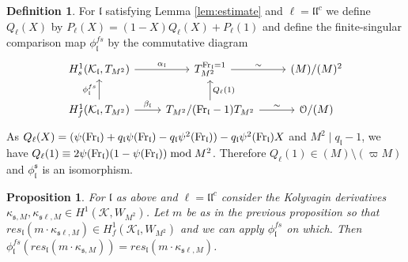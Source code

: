\documentclass[leqno]{amsart}
\newtheorem{prop}[thm]{Proposition}
\theoremstyle{definition}
\newtheorem{defn}[thm]{Definition}
\theoremstyle{remark}
\newcommand{\eo}{\EuScript{O}}
\newcommand{\Fr}{\textnormal{Fr}} %
\newcommand{\fl}{\mathfrak{l}}
\newcommand{\fs}{\mathfrak{s}}
\newcommand{\K}{{\mathcal{K}}} %
\begin{document}
\begin{defn}\label{def:finite_singular}
For $\fl$ satisfying Lemma \ref{lem:estimate} and $\ell=\fl\fl^c$
we define $Q_\ell(X)$ by
$P_\ell(X)=(1-X)Q_\ell(X)+P_\ell(1)$
and define the finite-singular comparison map
$\phi_\fl^{fs}$ by the commutative diagram
\[
	\begin{tikzcd}
		H^1_s(\K_\fl, T_{M^2}) \arrow[r,"\alpha_\fl"]&
		T_{M^2}^{\Fr_\fl=1} \arrow[r,"\sim"]&
        (M)/(M)^2\\
		H^1_{f}(\K_\fl, T_{M^2}) \arrow[r,"\beta_\fl"]
		\arrow[u,"\phi_\fl^{fs}"]&
		T_{M^2}/(\Fr_\fl-1)T_{M^2}
		\arrow[u,"Q_\ell(1)",swap]\arrow[r,"\sim"]&
        \eo/(M)
	\end{tikzcd}
\]
As $Q_\ell(X)=(\psi(\Fr_\fl)+q_\fl\psi(\Fr_\fl)-q_\fl\psi^2(\Fr_\fl))-
q_\fl\psi^2(\Fr_\fl)X$
and $M^2\mid q_\fl-1$, we have
$Q_\ell(1)\equiv 2\psi(\Fr_\fl)(1-\psi(\Fr_\fl))\bmod M^2$.
Therefore $Q_\ell(1)\in (M)\setminus (\varpi M)$
and $\phi_\fl^{\fs}$ is an isomorphism.
\end{defn}





\begin{prop}

For $\fl$ as above and $\ell=\fl\fl^c$
consider the Kolyvagin derivatives
$\kappa_{\fs,M}, \kappa_{\fs\ell,M}\in H^1(\K, W_{M^2})$.
Let $m$ be as in the previous proposition
so that $res_\fl(m\cdot \kappa_{\fs\ell,M})\in H^1_f(\K_\fl,W_{M^2})$
and we can apply $\phi_\fl^{fs}$ on which.
Then    
$\phi_\fl^{fs}(res_{\fl}(m\cdot \kappa_{\fs,M}))=
res_\fl(m\cdot \kappa_{\fs\ell,M})$.
\end{prop}
\end{document}
